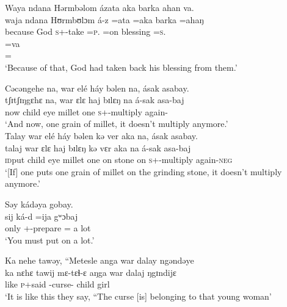  \ea  Waya  ndana  Hərmbəlom  ázata  aka  barka  ahan  va.\\
 \gll waja   ndana  Hʊrmbʊlɔm   á-z    =ata      =aka   barka     =ahaŋ\\    
 because   {\DEM}   God             \textsc{s}+{\IFV}-take  =\textsc{p}.{\IO}  =on   blessing  =\textsc{s}.{\POSS}\\  
 
 \medskip
 \gll =va \\
      ={\PRF}\\
 \glt ‘Because of that, God had taken back his blessing from them.’\\
 \z
 
 \ea  Cəcəngehe  na,  war  elé  háy  bəlen  na,  ásak  asabay.\\
 \gll tʃɪtʃɪŋgɛhɛ  na,  war  ɛlɛ  haj  bɪlɛŋ  na  á-sak asa-baj\\
 now {\PSP}  child   eye   millet   one   {\PSP}  \textsc{s}+{\IFV}-multiply    again-{\NEG}\\
 \glt ‘And now, one grain of millet, it doesn’t multiply anymore.’\\
 \z
 \ea  Talay  war  elé  háy  bəlen  kə  ver  aka  na,  ásak  asabay.\\
 \gll talaj     war  ɛlɛ  haj  bɪlɛŋ  kə  vɛr  aka  na  á-sak       asa-baj\\
 \textsc{id}put  child   eye   millet    one    on    stone    on    {\PSP}  \textsc{s}+{\IFV}-multiply  again-\textsc{neg}\\
 \glt ‘[If] one puts one grain of millet on the grinding stone, it doesn’t multiply anymore.’\\
 \z
 
 \ea  Səy  kádəya  gobay.\\
 \gll sij ká-d    =ija  gʷɔbaj\\
 only    {\twoS}+{\IFV}-prepare  ={\PLU}   {a lot}\\
 \glt ‘You must put on a lot.’\\
 \z
 
 \ea  Ka  nehe  tawəy,  “Metesle  anga  war  dalay  ngəndəye  \\
\gll ka  nɛhɛ  tawij  mɛ-tɛɬ-ɛ      aŋga  war    dalaj  ŋgɪndijɛ \\
 like  {\DEM}   \textsc{p}+said  {\NOM}{}-curse-{\CL}   {\POSS}   child  girl       {\DEM}      \\
 \glt ‘It is like this they say, “The curse [is] belonging to that young woman’\\
 

